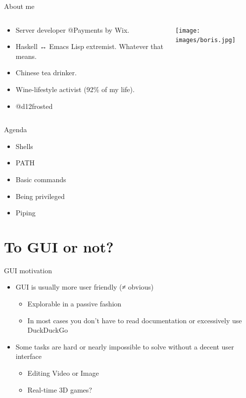 \documentclass[presentation,aspectratio=169,smaller]{beamer}
\begin{document}
\begin{frame}[label={sec:org5036d19}]{About me}
\begin{columns}
\begin{column}{0.75\columnwidth}
\begin{itemize}
\item Server developer @Payments by Wix.
\item Haskell ↔ Emacs Lisp extremist. Whatever that means.
\item Chinese tea drinker.
\item Wine-lifestyle activist (92\% of my life).
\item @d12frosted
\end{itemize}
\end{column}

\begin{column}{0.25\columnwidth}
\begin{center}
\texttt{[image: images/boris.jpg]}
\end{center}
\end{column}
\end{columns}
\end{frame}

\begin{frame}[label={sec:org7306622}]{Agenda}
\begin{itemize}
\item Shells
\item PATH
\item Basic commands
\item Being privileged
\item Piping
\end{itemize}
\end{frame}

\section{To GUI or not?}
\label{sec:org72821d8}

\begin{frame}[label={sec:org7827cf0}]{GUI motivation}
\begin{itemize}
\item GUI is usually more user friendly (≠ obvious)
\begin{itemize}
\item Explorable in a passive fashion
\item In most cases you don’t have to read documentation or excessively use DuckDuckGo
\end{itemize}
\item Some tasks are hard or nearly impossible to solve without a decent user interface
\begin{itemize}
\item Editing Video or Image
\item Real-time 3D games?
\end{itemize}
\end{itemize}
\end{frame}
\end{document}
